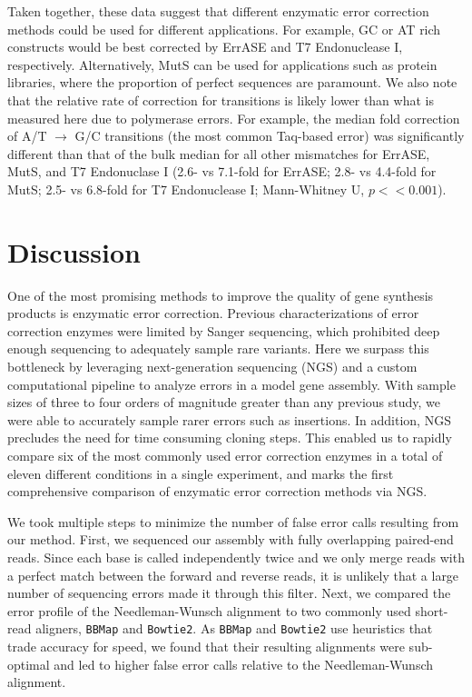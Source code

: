 \documentclass[letterpaper,12pt]{article}
\begin{document}
Taken together, these data suggest that different enzymatic error correction methods could be used for different applications. For example, GC or AT rich constructs would be best corrected by ErrASE and T7 Endonuclease I, respectively. Alternatively, MutS can be used for applications such as protein libraries, where the proportion of perfect sequences are paramount. We also note that the relative rate of correction for transitions is likely lower than what is measured here due to polymerase errors. For example, the median fold correction of A/T $\to$ G/C transitions (the most common Taq-based error) was significantly different than that of the bulk median for all other mismatches for ErrASE, MutS, and T7 Endonuclase I (2.6- vs 7.1-fold for ErrASE; 2.8- vs 4.4-fold for MutS; 2.5- vs 6.8-fold for T7 Endonuclease I; Mann-Whitney U, $p << 0.001$).

%
\section*{Discussion}
%
One of the most promising methods to improve the quality of gene synthesis products is enzymatic error correction. Previous characterizations of error correction enzymes were limited by Sanger sequencing, which prohibited deep enough sequencing to adequately sample rare variants. Here we surpass this bottleneck by leveraging next-generation sequencing (NGS) and a custom computational pipeline to analyze errors in a model gene assembly. With sample sizes of three to four orders of magnitude greater than any previous study, we were able to accurately sample rarer errors such as insertions. In addition, NGS precludes the need for time consuming cloning steps. This enabled us to rapidly compare six of the most commonly used error correction enzymes in a total of eleven different conditions in a single experiment, and marks the first comprehensive comparison of enzymatic error correction methods via NGS.

We took multiple steps to minimize the number of false error calls resulting from our method. First, we sequenced our assembly with fully overlapping paired-end reads. Since each base is called independently twice and we only merge reads with a perfect match between the forward and reverse reads, it is unlikely that a large number of sequencing errors made it through this filter. Next, we compared the error profile of the Needleman-Wunsch alignment to two commonly used short-read aligners, \texttt{BBMap} and \texttt{Bowtie2}. As \texttt{BBMap} and \texttt{Bowtie2} use heuristics that trade accuracy for speed, we found that their resulting alignments were sub-optimal and led to higher false error calls relative to the Needleman-Wunsch alignment.
\end{document}

